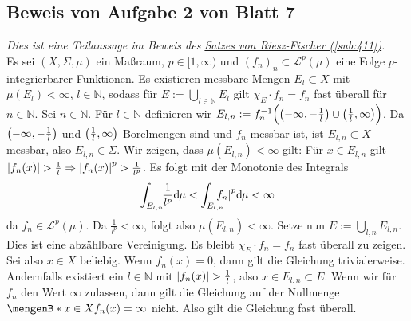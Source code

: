 \subsection{Beweis von Aufgabe 2 von Blatt 7} %
\label{sub:blatt7_aufg2}
\emph{Dies ist eine Teilaussage im Beweis des \hyperref[sub:411]{Satzes von Riesz-Fischer (\ref*{sub:411})}.}\\
Es sei $(X,\Sigma,\mu)$ ein Maßraum, $p \in [1,\infty)$ und $(f_n)_n \subset \mathcal{L}^p(\mu)$ eine Folge $p$-integrierbarer Funktionen.
Es existieren messbare Mengen $E_l \subset X$ mit $\mu(E_l)< \infty$, $l \in \mathds{N}$, sodass für $E := \bigcup_{l \in \mathds{N}}E_l$ gilt $\chi_E \cdot f_n = f_n$ fast
überall für $n \in \mathds{N}$.
Sei $n \in \mathds{N}$. Für $l \in \mathds{N}$ definieren wir
\(
	E_{l,n} := f_n^{-1}\enbrace[\Big]{\enbrace*{-\infty,-\frac{1}{l}} \cup \enbrace*{\frac{1}{l},\infty} } 
\).
Da $\enbrace*{-\infty,-\frac{1}{l}}$ und $\enbrace*{\frac{1}{l},\infty}$ Borelmengen sind und $f_n$ messbar ist, ist $E_{l,n}\subset X$ messbar, also $E_{l,n} \in \Sigma$.
Wir zeigen, dass $\mu(E_{l,n})<\infty$ gilt: Für $x \in E_{l,n}$ gilt $\abs*{f_n(x)} > \frac{1}{l} \Rightarrow \abs*{f_n(x)}^p > \frac{1}{l^p}$. Es folgt mit der Monotonie 
des Integrals
\begin{align*}
	\int_{E_{l,n}} \!\! \frac{1}{l^p} \mathd\mu < \int_{E_{l,n}} \hspace{-1em}\abs*{f_n}^p\mathd\mu < \infty
\end{align*}
da $f_n \in \mathcal{L}^p(\mu)$. Da $\frac{1}{l^p}<\infty $, folgt also $\mu(E_{l,n})<\infty$. Setze nun $E := \bigcup_{l,n} E_{l,n}$. Dies ist eine abzählbare Vereinigung.
Es bleibt $\chi_E \cdot f_n = f_n$ fast überall zu zeigen. Sei also $x \in X$ beliebig. Wenn $f_n(x)=0$, dann gilt die Gleichung trivialerweise. Andernfalls existiert ein 
$l \in \mathds{N}$ mit $\abs*{f_n(x)} > \frac{1}{l}$, also $x \in E_{l,n} \subset E$. Wenn wir für $f_n$ den Wert $\infty$ zulassen, dann gilt die Gleichung auf der Nullmenge
$\set[x \in X]{f_n(x)=\infty}$ nicht. Also gilt die Gleichung fast überall. \bewende

